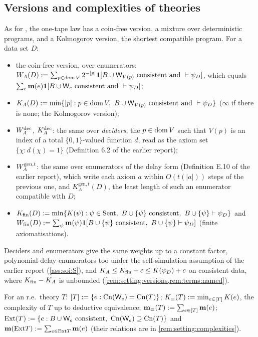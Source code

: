\subsection{Versions and complexities of theories}\label{sec:setting:versions}

\begin{definition}[Versions]\label{def:setting:versions}
As for \SOIabbr, the one-tape law has a coin-free version, a mixture over deterministic programs, and a Kolmogorov version, the shortest compatible program. For a data set $D$:
\begin{itemize}[leftmargin=*]
\item the coin-free version, over enumerators: $W_{A}(D):=\sum_{p\in\operatorname{dom} V}2^{-\lvert p\rvert}\mathbf{1}[B\cup\mathsf{W}_{V(p)}\text{ consistent and }\vdash\psi_D]$, which equals $\sum_e\mathbf{m}(e)\mathbf{1}[B\cup\mathsf{W}_{e}\text{ consistent and }\vdash\psi_D]$;
\item $K_{A}(D):=\min\{\lvert p\rvert:p\in\operatorname{dom} V,\ B\cup\mathsf{W}_{V(p)}\text{ consistent and }\vdash\psi_D\}$ ($\infty$ if there is none; the Kolmogorov version);
\item $W_{A}^{\mathrm{dec}}$, $K_{A}^{\mathrm{dec}}$: the same over \emph{deciders}, the $p\in\operatorname{dom} V$ such that $V(p)$ is an index of a total $\{0,1\}$-valued function $d$, read as the axiom set $\{\chi:d(\chi)=1\}$ (Definition 6.2 of the earlier report);
\item $W_{A}^{\mathrm{gen},t}$: the same over enumerators of the delay form (Definition E.10 of the earlier report), which write each axiom $a$ within $O(t(\lvert a\rvert))$ steps of the previous one, and $K_A^{\mathrm{gen},t}(D)$, the least length of such an enumerator compatible with $D$;
\item $\Kfin(D):=\min\{K(\psi):\psi\in\Sent,\ B\cup\{\psi\}\text{ consistent},\ B\cup\{\psi\}\vdash\psi_D\}$ and $W_{\mathrm{fin}}(D):=\sum_\psi\mathbf{m}(\psi)\mathbf{1}[B\cup\{\psi\}\text{ consistent},\ B\cup\{\psi\}\vdash\psi_D]$ (finite axiomatisations).
\end{itemize}
\end{definition}

Deciders and enumerators give the same weights up to a constant factor, polynomial-delay enumerators too under the self-simulation assumption of the earlier report (\cref{ass:soi:S}), and $K_{A}\le K_{\mathrm{fin}}+c\le K(\psi_D)+c$ on consistent data, where $K_{\mathrm{fin}}-K_{A}$ is unbounded (\cref{rem:setting:versions,rem:terms:named}).

\begin{definition}\label{def:setting:complexities}
For an r.e.\ theory $T$: $[T]:=\{e:\mathrm{Cn}(\mathsf{W}_{e})=\mathrm{Cn}(T)\}$; $K_{\equiv}(T):=\min_{e\in[T]}K(e)$, the complexity of $T$ up to deductive equivalence; $\mathbf{m}_{\equiv}(T):=\sum_{e\in[T]}\mathbf{m}(e)$; $\Exts(T):=\{e:B\cup\re e\text{ consistent},\ \Cn(\re e)\supseteq\Cn(T)\}$ and $\mathbf{m}(\mathrm{Ext} T):=\sum_{e\in\mathrm{Ext} T}\mathbf{m}(e)$ (their relations are in \cref{rem:setting:complexities}).
\end{definition}

